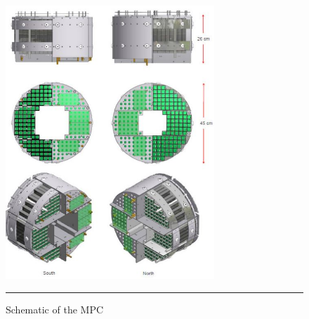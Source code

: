 \begin{figure}[h!]
  \centering
    \includegraphics[width=0.7\textwidth]{Figures/mpcschematic.JPG}
    \rule{35em}{0.5pt}
  \caption[Schematic of the MPC]{Schematic of the MPC}
  \label{fig:mpcschematic}
\end{figure}


